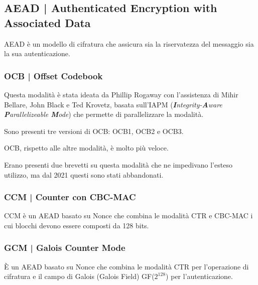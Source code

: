 
\subsection{AEAD | Authenticated Encryption with Associated Data}

\textsf{\small AEAD è un modello di cifratura che assicura sia la riservatezza del messaggio sia la sua autenticazione.}

\subsubsection{OCB | Offset Codebook} %


\textsf{\small Questa modalità è stata ideata da Phillip Rogaway con l'assistenza di Mihir Bellare, John Black e Ted Krovetz, basata sull'IAPM (\emph{\textbf{I}ntegrity-\textbf{A}ware \textbf{P}arallelizeable \textbf{M}ode}) che permette di parallelizzare la modalità.}

\textsf{\small Sono presenti tre versioni di OCB: OCB1, OCB2 e OCB3.}

\textsf{\small OCB, rispetto alle altre modalità, è molto più veloce.}

\textsf{\small Erano presenti due brevetti su questa modalità che ne impedivano l'esteso utilizzo, ma dal 2021 questi sono stati abbandonati.} %

\subsubsection{CCM | Counter con CBC-MAC}

\textsf{\small CCM è un AEAD basato su Nonce che combina le modalità CTR e CBC-MAC i cui blocchi devono essere composti da 128 bits.}

\subsubsection{GCM | Galois Counter Mode}

\textsf{\small È un AEAD basato su Nonce che combina le modalità CTR per l'operazione di cifratura e il campo di Galois (Galois Field) GF($2^{128}$) per l'autenticazione.}

